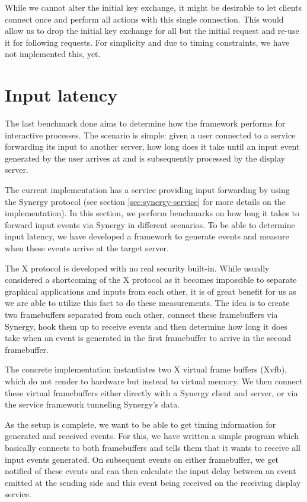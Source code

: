 While we cannot alter the initial key exchange, it might be desirable to let clients connect once and perform all actions with this single connection.
This would allow us to drop the initial key exchange for all but the initial request and re-use it for following requests.
For simplicity and due to timing constraints, we have not implemented this, yet.

\section{Input latency}

The last benchmark done aims to determine how the framework performs for interactive processes.
The scenario is simple: given a user connected to a service forwarding its input to another server, how long does it take until an input event generated by the user arrives at and is subsequently processed by the display server.

The current implementation has a service providing input forwarding by using the Synergy protocol (see section \ref{sec:synergy-service} for more details on the implementation).
In this section, we perform benchmarks on how long it takes to forward input events via Synergy in different scenarios.
To be able to determine input latency, we have developed a framework to generate events and measure when these events arrive at the target server.

The X protocol is developed with no real security built-in.
While usually considered a shortcoming of the X protocol as it becomes impossible to separate graphical applications and inputs from each other, it is of great benefit for us as we are able to utilize this fact to do these measurements.
The idea is to create two framebuffers separated from each other, connect these framebuffers via Synergy, hook them up to receive events and then determine how long it does take when an event is generated in the first framebuffer to arrive in the second framebuffer.

The concrete implementation instantiates two X virtual frame buffers (Xvfb), which do not render to hardware but instead to virtual memory.
We then connect these virtual framebuffers either directly with a Synergy client and server, or via the service framework tunneling Synergy's data.

As the setup is complete, we want to be able to get timing information for generated and received events.
For this, we have written a simple program which basically connects to both framebuffers and tells them that it wants to receive all input events generated.
On subsequent events on either framebuffer, we get notified of these events and can then calculate the input delay between an event emitted at the sending side and this event being received on the receiving display service.

